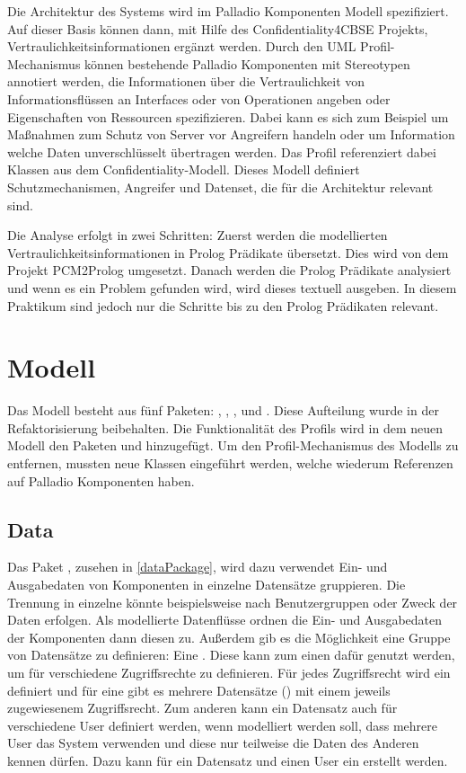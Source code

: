 \documentclass[twoside, ngerman]{sdqseminar}
\begin{document}
Die Architektur des Systems wird im Palladio Komponenten Modell spezifiziert. Auf dieser Basis können dann, mit Hilfe des Confidentiality4CBSE Projekts, Vertraulichkeitsinformationen ergänzt werden. Durch den UML Profil-Mechanismus können bestehende Palladio Komponenten mit Stereotypen annotiert werden, die Informationen über die Vertraulichkeit von Informationsflüssen an Interfaces oder von Operationen angeben oder Eigenschaften von Ressourcen spezifizieren. Dabei kann es sich zum Beispiel um Maßnahmen zum Schutz von Server vor Angreifern handeln oder um Information welche Daten unverschlüsselt übertragen werden. Das Profil referenziert dabei Klassen aus dem Confidentiality-Modell. Dieses Modell definiert Schutzmechanismen, Angreifer und Datenset, die für die Architektur relevant sind.

Die Analyse erfolgt in zwei Schritten: Zuerst werden die modellierten Vertraulichkeitsinformationen in Prolog Prädikate übersetzt. Dies wird von dem Projekt PCM2Prolog umgesetzt. Danach werden die Prolog Prädikate analysiert und wenn es ein Problem gefunden wird, wird dieses textuell ausgeben. In diesem Praktikum sind jedoch nur die Schritte bis zu den Prolog Prädikaten relevant.

\section{Modell}
Das Modell besteht aus fünf Paketen: , , ,  und  . Diese Aufteilung wurde in der Refaktorisierung beibehalten. Die Funktionalität des Profils wird in dem neuen Modell den Paketen  und  hinzugefügt. Um den Profil-Mechanismus des Modells zu entfernen, mussten neue Klassen eingeführt werden, welche wiederum Referenzen auf Palladio Komponenten haben. 
\subsection{Data}
Das Paket , zusehen in \autoref{dataPackage}, wird dazu verwendet Ein- und Ausgabedaten von Komponenten in einzelne Datensätze  gruppieren. Die Trennung in einzelne  könnte beispielsweise nach Benutzergruppen oder Zweck der Daten erfolgen. Als  modellierte Datenflüsse ordnen die Ein- und Ausgabedaten der Komponenten dann diesen  zu. Außerdem gib es die Möglichkeit eine Gruppe von Datensätze zu definieren: Eine . Diese kann zum einen dafür genutzt werden, um  für verschiedene Zugriffsrechte zu definieren. Für jedes Zugriffsrecht wird ein  definiert und für eine  gibt es mehrere Datensätze () mit einem jeweils zugewiesenem Zugriffsrecht. Zum anderen kann ein Datensatz auch für verschiedene User definiert werden, wenn modelliert werden soll, dass mehrere User das System verwenden und diese nur teilweise die Daten des Anderen kennen dürfen. Dazu kann für ein Datensatz und einen User ein  erstellt werden.
\end{document}
